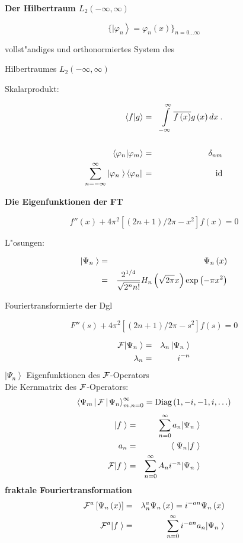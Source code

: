 \documentclass[11pt]{article}
\begin{document}
\newpage
\centerline{\bf \Huge Der Hilbertraum $L_2\left(-\infty ,\infty\right)$ }
\vfill
$$\{ |\varphi_n\left.\right> =\varphi_n\left(x\right) \}_{n=0 \ldots \infty} $$ 
\vfill
\centerline{vollst"andiges und orthonormiertes System des }
\centerline{Hilbert\-raumes $L_2\left(-\infty ,\infty\right)$} 
\vfill
\centerline{Skalarprodukt:}
\begin{eqnarray*}
\left<f|g\right> & = & \int\limits_{-\infty}^{\infty} \overline{f\left( x\right)} g\left( x\right) dx \: . \\
& & \\
\left<\varphi_n | \varphi_m \right> & = & \delta_{nm} \\
\sum_{n=-\infty}^{\infty}|\varphi_n\left. \right>\left<\varphi_n|\right. & = & \mbox{id} 
\end{eqnarray*}
\vfill

\newpage
\centerline{\bf \Huge Die Eigenfunktionen der FT}
\vfill
$$f''\left( x\right) + 4\pi ^2\left[ \left(2n + 1\right)/2 \pi - x^2\right] f\left( x\right) = 0$$
\vfill
\centerline{L"osungen:}
\begin{eqnarray*}
  |\Psi_n\left.\right> & = & \Psi_n \left( x \right) \\
                       & = & \frac{2^{1/4}} {\sqrt{2^n n!}} H_n \left( \sqrt{2\pi}x \right) \exp\left( - \pi x^2 \right) \\
\end{eqnarray*}
\vfill
\centerline{Fouriertransformierte der Dgl}
$$F''\left( s\right) + 4\pi ^2\left[ \left(2n + 1\right)/2 \pi - s^2\right] f\left( s\right) = 0$$
\vfill

\newpage
\vfill
\begin{eqnarray*}
{\cal F}|\Psi_n\left.\right> & = & \lambda_n \, |\Psi_n\left.\right> \\
\lambda_n & = & i^{-n}
\end{eqnarray*}
$|\Psi_n\left.\right>$ Eigenfunktionen des ${\cal F}$-Operators \\ 
Die Kernmatrix des ${\cal F}$-Operators: 
$$ \left< \Psi_m \right. \!| \, {\cal F} \, |\! \left. \Psi_n \right>_{m,n=0}^{\infty} = \mbox{Diag}\left(1,-i,-1,i,\ldots\right)$$
\vfill
\begin{eqnarray*}
  |f\left. \right> & = & \sum_{n=0}^{\infty}a_n |\Psi_n \left. \right> \\ 
  a_n & = & \left< \right. \Psi_n | f \left. \right> \\
  {\cal F}|f \left. \right> & = & \sum_{n=0}^{\infty}A_n i^{-n} |\Psi_n \left. \right> 
\end{eqnarray*}
\vfill
{\bf fraktale Fouriertransformation}
\begin{eqnarray*}
{\cal F}^a \left[{\Psi}_n \left( x \right)\right] & = & {\lambda}_n^{a} \Psi_n \left( x\right)=i^{-an}\Psi _n\left( x\right) \\
{\cal F}^{a}| f\left. \right> & = & \sum_{n=0}^{\infty}i^{-an}a_n |\Psi _n \left. \right> 
\end{eqnarray*}
\vfill
\end{document}

